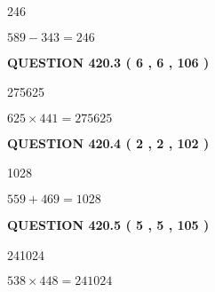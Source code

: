 \documentclass{ctexart}
\begin{document}
246
 
 
 
 
\noindent{}

$ %
589 -  %
343=   %
246$
 
 
  
\vspace{0.2in}
  
{\textbf{\Large{QUESTION
420.3 
 ( 6 , 6 , 106 )
}}}
  
  
 
 
\noindent{}

275625
 
 
 
 
\noindent{}

$ %
625 \times  %
441=   %
275625$
 
 
  
\vspace{0.2in}
  
{\textbf{\Large{QUESTION
420.4 
 ( 2 , 2 , 102 )
}}}
  
  
 
 
\noindent{}

1028
 
 
 
 
\noindent{}

$ %
559 +  %
469=   %
1028$
 
 
  
\vspace{0.2in}
  
{\textbf{\Large{QUESTION
420.5 
 ( 5 , 5 , 105 )
}}}
  
  
 
 
\noindent{}

241024
 
 
 
 
\noindent{}

$ %
538 \times  %
448=   %
241024$
 
 
  
\vspace{0.2in}
  
\end{document}

